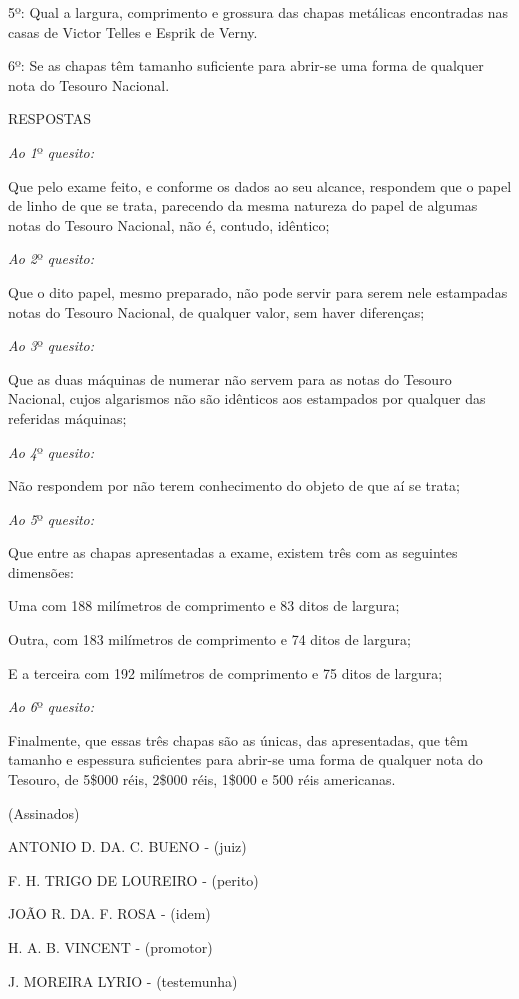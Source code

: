 5º: Qual a largura, comprimento e grossura das chapas metálicas
encontradas nas casas de Victor Telles e Esprik de Verny.

6º: Se as chapas têm tamanho suficiente para abrir-se uma forma de
qualquer nota do Tesouro Nacional.

RESPOSTAS

\emph{Ao 1}º \emph{quesito:}

Que pelo exame feito, e conforme os dados ao seu alcance, respondem que
o papel de linho de que se trata, parecendo da mesma natureza do papel
de algumas notas do Tesouro Nacional, não é, contudo, idêntico;

\emph{Ao 2}º \emph{quesito:}

Que o dito papel, mesmo preparado, não pode servir para serem nele
estampadas notas do Tesouro Nacional, de qualquer valor, sem haver
diferenças;

\emph{Ao 3}º \emph{quesito:}

Que as duas máquinas de numerar não servem para as notas do Tesouro
Nacional, cujos algarismos não são idênticos aos estampados por qualquer
das referidas máquinas;

\emph{Ao 4}º \emph{quesito:}

Não respondem por não terem conhecimento do objeto de que aí se trata;

\emph{Ao 5}º \emph{quesito:}

Que entre as chapas apresentadas a exame, existem três com as seguintes
dimensões:

Uma com 188 milímetros de comprimento e 83 ditos de largura;

Outra, com 183 milímetros de comprimento e 74 ditos de largura;

E a terceira com 192 milímetros de comprimento e 75 ditos de largura;

\emph{Ao 6}º \emph{quesito:}

Finalmente, que essas três chapas são as únicas, das apresentadas, que
têm tamanho e espessura suficientes para abrir-se uma forma de qualquer
nota do Tesouro, de 5\$000 réis, 2\$000 réis, 1\$000 e 500 réis
americanas.

(Assinados)

ANTONIO D. DA. C. BUENO - (juiz)

F. H. TRIGO DE LOUREIRO - (perito)

JOÃO R. DA. F. ROSA - (idem)

H. A. B. VINCENT - (promotor)

J. MOREIRA LYRIO - (testemunha)

